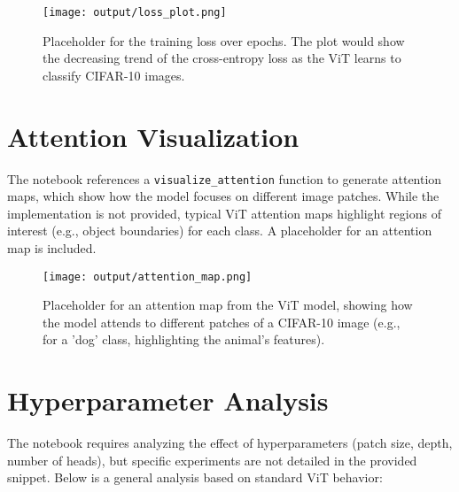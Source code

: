 \documentclass{article}
\begin{document}
\begin{itemize}
\begin{center}
\end{center}


\end{itemize}

\begin{figure}[h]
    \centering
    \texttt{[image: output/loss\_plot.png]}
    \caption{Placeholder for the training loss over epochs. The plot would show the decreasing trend of the cross-entropy loss as the ViT learns to classify CIFAR-10 images.}
    \label{fig:loss_plot}
\end{figure}

\section{Attention Visualization}
The notebook references a \texttt{visualize\_attention} function to generate attention maps, which show how the model focuses on different image patches. While the implementation is not provided, typical ViT attention maps highlight regions of interest (e.g., object boundaries) for each class. A placeholder for an attention map is included.

\begin{figure}[h]
    \centering
    \texttt{[image: output/attention\_map.png]}
    \caption{Placeholder for an attention map from the ViT model, showing how the model attends to different patches of a CIFAR-10 image (e.g., for a 'dog' class, highlighting the animal's features).}
    \label{fig:attention_map}
\end{figure}

\section{Hyperparameter Analysis}
The notebook requires analyzing the effect of hyperparameters (patch size, depth, number of heads), but specific experiments are not detailed in the provided snippet. Below is a general analysis based on standard ViT behavior:
\end{document}
